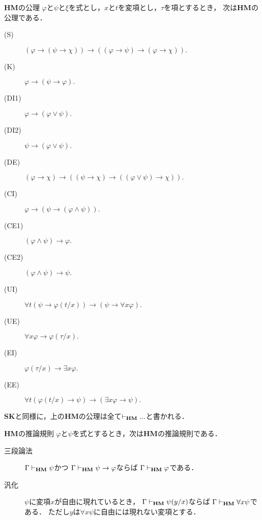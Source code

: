 	\begin{itembox}[l]{{\bf HM}の公理}
		$\varphi$と$\psi$と$\xi$を式とし，$x$と$t$を変項とし，$\tau$を項とするとき，
		次は{\bf HM}の公理である．
		\begin{description}
			\item[(S)] $(\varphi \rightarrow (\psi \rightarrow \chi)) 
				\rightarrow ((\varphi \rightarrow \psi)
				\rightarrow (\varphi \rightarrow \chi)).$
			\item[(K)] $\varphi \rightarrow (\psi \rightarrow \varphi).$
			\item[(DI1)] $\varphi \rightarrow (\varphi \vee \psi).$
			\item[(DI2)] $\psi \rightarrow (\varphi \vee \psi).$
			\item[(DE)] $(\varphi \rightarrow \chi) \rightarrow 
				((\psi \rightarrow \chi) \rightarrow ((\varphi \vee \psi) \rightarrow \chi)).$
			\item[(CI)] $\varphi \rightarrow (\psi \rightarrow (\varphi \wedge \psi)).$
			\item[(CE1)] $(\varphi \wedge \psi) \rightarrow \varphi.$
			\item[(CE2)] $(\varphi \wedge \psi) \rightarrow \psi.$
			\item[(UI)] $\forall t (\psi \rightarrow \varphi(t/x)) 
				\rightarrow (\psi \rightarrow \forall x \varphi).$
			\item[(UE)] $\forall x \varphi \rightarrow \varphi(\tau/x).$
			\item[(EI)] $\varphi(\tau/x) \rightarrow \exists x \varphi.$
			\item[(EE)] $\forall t (\varphi(t/x) \rightarrow \psi)
				\rightarrow (\exists x \varphi \rightarrow \psi).$
		\end{description}
	\end{itembox}
	
	{\bf SK}と同様に，上の{\bf HM}の公理は全て$\vdash_{{\scriptsize \mbox{{\bf HM}}}} ...$と書かれる．
	
	\begin{itembox}[l]{{\bf HM}の推論規則}
		$\varphi$と$\psi$を式とするとき，次は{\bf HM}の推論規則である．
		\begin{description}
			\item[三段論法] $\Gamma \vdash_{{\scriptsize \mbox{{\bf HM}}}} \psi$かつ
				$\Gamma \vdash_{{\scriptsize \mbox{{\bf HM}}}} \psi \rightarrow \varphi$ならば
				$\Gamma \vdash_{{\scriptsize \mbox{{\bf HM}}}} \varphi$である．
			\item[汎化] $\psi$に変項$x$が自由に現れているとき，
				$\Gamma \vdash_{{\scriptsize \mbox{{\bf HM}}}} \psi(y/x)$ならば
				$\Gamma \vdash_{{\scriptsize \mbox{{\bf HM}}}} \forall x \psi$である．
				ただし$y$は$\forall x \psi$に自由には現れない変項とする．
		\end{description}
	\end{itembox}
	
